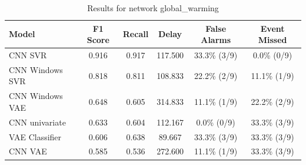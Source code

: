 \begin{table}
\caption{Results for network global_warming}
\label{tab:results-global_warming}
\begin{tabular}{lccccc}
\toprule
Model & F1 Score & Recall & Delay & False Alarms & Event Missed \\
\midrule
CNN SVR & 0.916 & 0.917 & 117.500 & 33.3\% (3/9) & 0.0\% (0/9) \\
CNN Windows SVR & 0.818 & 0.811 & 108.833 & 22.2\% (2/9) & 11.1\% (1/9) \\
CNN Windows VAE & 0.648 & 0.605 & 314.833 & 11.1\% (1/9) & 22.2\% (2/9) \\
CNN univariate & 0.633 & 0.604 & 112.167 & 0.0\% (0/9) & 33.3\% (3/9) \\
VAE Classifier & 0.606 & 0.638 & 89.667 & 33.3\% (3/9) & 33.3\% (3/9) \\
CNN VAE & 0.585 & 0.536 & 272.600 & 11.1\% (1/9) & 33.3\% (3/9) \\
\bottomrule
\end{tabular}
\end{table}
